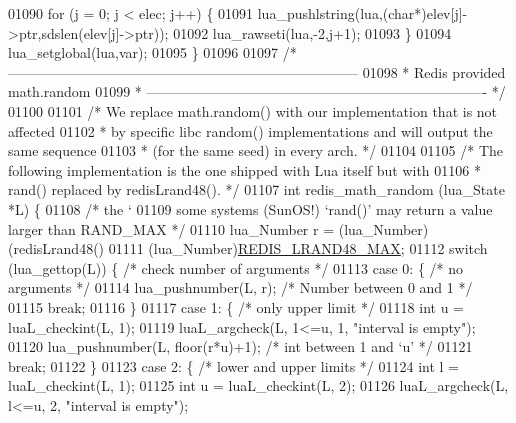 \begin{DoxyCode}
{{{{{{{{01090     \textcolor{keywordflow}{for} (j = 0; j < elec; j++) \{
01091         lua\_pushlstring(lua,(\textcolor{keywordtype}{char}*)elev[j]->ptr,sdslen(elev[j]->ptr));
01092         lua\_rawseti(lua,-2,j+1);
01093     \}
01094     lua\_setglobal(lua,var);
01095 \}
01096 
01097 \textcolor{comment}{/* ---------------------------------------------------------------------------}
01098 \textcolor{comment}{ * Redis provided math.random}
01099 \textcolor{comment}{ * ------------------------------------------------------------------------- */}
01100 
01101 \textcolor{comment}{/* We replace math.random() with our implementation that is not affected}
01102 \textcolor{comment}{ * by specific libc random() implementations and will output the same sequence}
01103 \textcolor{comment}{ * (for the same seed) in every arch. */}
01104 
01105 \textcolor{comment}{/* The following implementation is the one shipped with Lua itself but with}
01106 \textcolor{comment}{ * rand() replaced by redisLrand48(). */}
01107 \textcolor{keywordtype}{int} redis\_math\_random (lua\_State *L) \{
01108   \textcolor{comment}{/* the `%
01109 \textcolor{comment}{     some systems (SunOS!) `rand()' may return a value larger than RAND\_MAX */}
01110   lua\_Number r = (lua\_Number)(redisLrand48()%
01111                                 (lua\_Number)\hyperlink{rand_8h_a182af7f92013fc310391b56e090dfd33}{REDIS\_LRAND48\_MAX};
01112   \textcolor{keywordflow}{switch} (lua\_gettop(L)) \{  \textcolor{comment}{/* check number of arguments */}
01113     \textcolor{keywordflow}{case} 0: \{  \textcolor{comment}{/* no arguments */}
01114       lua\_pushnumber(L, r);  \textcolor{comment}{/* Number between 0 and 1 */}
01115       \textcolor{keywordflow}{break};
01116     \}
01117     \textcolor{keywordflow}{case} 1: \{  \textcolor{comment}{/* only upper limit */}
01118       \textcolor{keywordtype}{int} u = luaL\_checkint(L, 1);
01119       luaL\_argcheck(L, 1<=u, 1, \textcolor{stringliteral}{"interval is empty"});
01120       lua\_pushnumber(L, floor(r*u)+1);  \textcolor{comment}{/* int between 1 and `u' */}
01121       \textcolor{keywordflow}{break};
01122     \}
01123     \textcolor{keywordflow}{case} 2: \{  \textcolor{comment}{/* lower and upper limits */}
01124       \textcolor{keywordtype}{int} l = luaL\_checkint(L, 1);
01125       \textcolor{keywordtype}{int} u = luaL\_checkint(L, 2);
01126       luaL\_argcheck(L, l<=u, 2, \textcolor{stringliteral}{"interval is empty"});
}}}}}}}}}
\end{DoxyCode}
